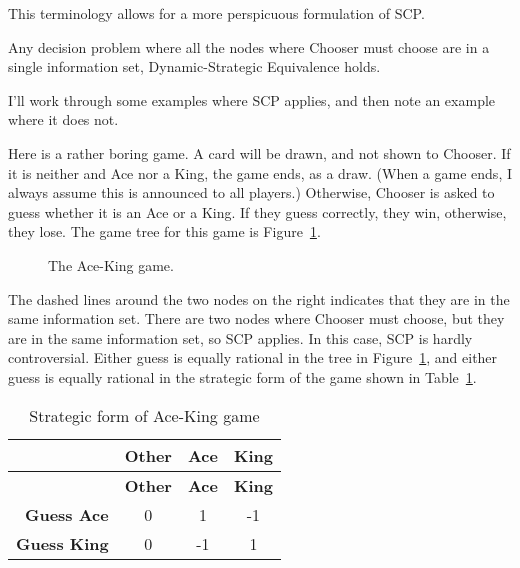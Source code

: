\documentclass[
  10pt,
  letterpaper,
  DIV=11,
  numbers=noendperiod,
  twoside]{scrartcl}
\providecommand{\tightlist}{%
  \setlength{\itemsep}{0pt}\setlength{\parskip}{0pt}}\usepackage{longtable,booktabs,array}
\begin{document}
This terminology allows for a more perspicuous formulation of SCP.

\begin{description}
\tightlist
\item[Single Choice Principle]
Any decision problem where all the nodes where Chooser must choose are
in a single information set, Dynamic-Strategic Equivalence holds.
\end{description}

I'll work through some examples where SCP applies, and then note an
example where it does not.

Here is a rather boring game. A card will be drawn, and not shown to
Chooser. If it is neither and Ace nor a King, the game ends, as a draw.
(When a game ends, I always assume this is announced to all players.)
Otherwise, Chooser is asked to guess whether it is an Ace or a King. If
they guess correctly, they win, otherwise, they lose. The game tree for
this game is Figure~\ref{fig-ace-king}.

\begin{figure}


\caption{\label{fig-ace-king}The Ace-King game.}

\end{figure}%

The dashed lines around the two nodes on the right indicates that they
are in the same information set. There are two nodes where Chooser must
choose, but they are in the same information set, so SCP applies. In
this case, SCP is hardly controversial. Either guess is equally rational
in the tree in Figure~\ref{fig-ace-king}, and either guess is equally
rational in the strategic form of the game shown in
Table~\ref{tbl-ace-king}.

\begin{longtable}[]{@{}rccc@{}}
\caption{Strategic form of Ace-King
game}\label{tbl-ace-king}\tabularnewline
\toprule\noalign{}
& \textbf{Other} & \textbf{Ace} & \textbf{King} \\
\midrule\noalign{}
\endfirsthead
\toprule\noalign{}
& \textbf{Other} & \textbf{Ace} & \textbf{King} \\
\midrule\noalign{}
\endhead
\bottomrule\noalign{}
\endlastfoot
\textbf{Guess Ace} & 0 & 1 & -1 \\
\textbf{Guess King} & 0 & -1 & 1 \\
\end{longtable}
\end{document}
